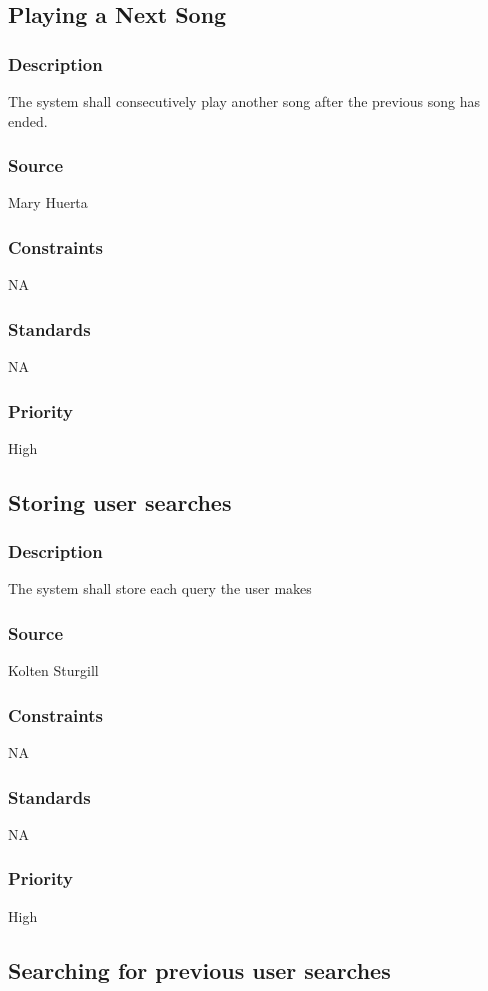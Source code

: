 \subsection{Playing a Next Song}
\subsubsection{Description}
The system shall consecutively play another song after the previous song has ended.
\subsubsection{Source}
Mary Huerta
\subsubsection{Constraints}
NA
\subsubsection{Standards}
NA
\subsubsection{Priority}
High



\subsection{Storing user searches}
\subsubsection{Description}
The system shall store each query the user makes
\subsubsection{Source}
Kolten Sturgill
\subsubsection{Constraints}
NA
\subsubsection{Standards}
NA
\subsubsection{Priority}
High




\subsection{Searching for previous user searches}

